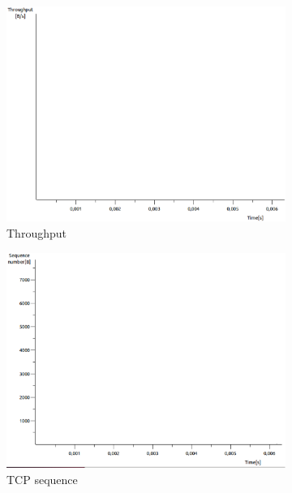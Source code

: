 \documentclass[conference,a4paper]{../../sty/IEEEtran}
\begin{document}
\begin{figure}
 \centering
 \begin{subfigure}[b]{0.2\textwidth}
  \includegraphics[width=\textwidth]{s5-3_th}
  \caption{Throughput}
 \end{subfigure}
 \begin{subfigure}[b]{0.2\textwidth}
  \includegraphics[width=\textwidth]{s5-3_seq}
  \caption{TCP sequence}
 \end{subfigure}
 \begin{subfigure}[b]{0.2\textwidth}

\end{subfigure}
\end{figure}
\end{document}
